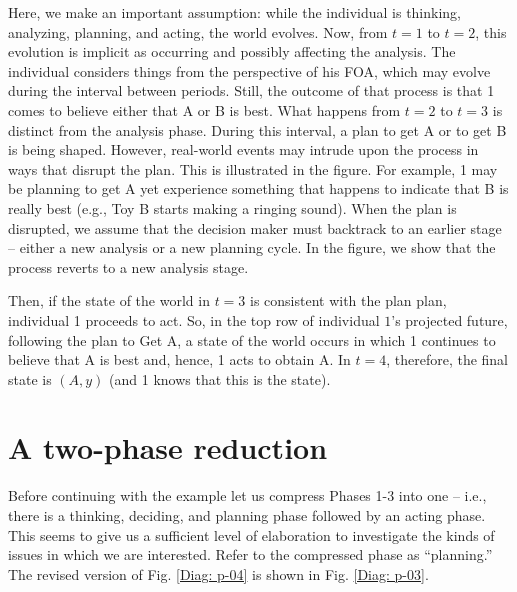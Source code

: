 \documentclass[
11pt,
titlepage,
reqno,
]{article}%
\theoremstyle{definition}
\begin{document}
Here, we make an important assumption: while the individual is thinking, analyzing, planning, and acting, the world evolves. Now, from $t=1$ to $t=2$, this evolution is implicit as occurring and possibly affecting the analysis. The individual considers things from the perspective of his FOA, which may evolve during the interval between periods. Still, the outcome of that process is that 1 comes to believe either that A or B is best. What happens from $t=2$ to $t=3$ is distinct from the analysis phase. During this interval, a plan to get A or to get B is being shaped. However, real-world events may intrude upon the process in ways that disrupt the plan. This is illustrated in the figure. For example, 1 may be planning to get A yet experience something that happens to indicate that B is really best (e.g., Toy B starts making a ringing sound). When the plan is disrupted, we assume that the decision maker must backtrack to an earlier stage -- either a new analysis or a new planning cycle. In the figure, we show that the process reverts to a new analysis stage.

Then, if the state of the world in $t=3$ is consistent with the plan plan, individual 1 proceeds to act. So, in the top row of individual $1$'s projected future, following the plan to Get A, a state of the world occurs in which 1 continues to believe that A is best and, hence, 1 acts to obtain A. In $t=4$, therefore, the final state is $(A,y)$ (and 1 knows that this is the state).

\section*{A two-phase reduction}
Before continuing with the example let us compress Phases 1-3  into one -- i.e., there is a thinking, deciding, and planning phase followed by an acting phase. This seems to give us a sufficient level of elaboration to investigate the kinds of issues in which we are interested. Refer to the compressed phase as ``planning.'' The revised version of Fig. \ref{Diag: p-04} is shown in Fig. \ref{Diag: p-03}.
 
\end{document}
